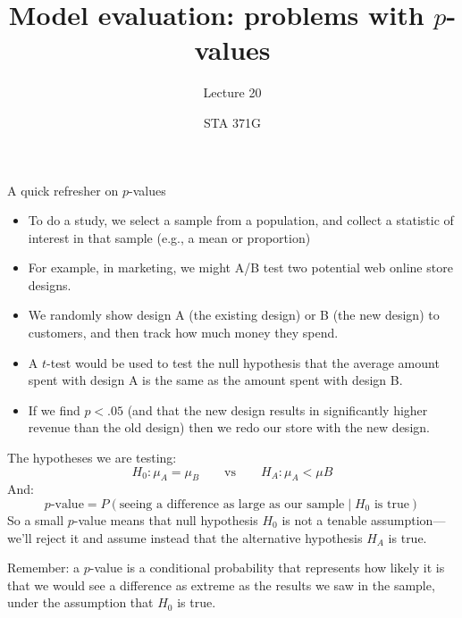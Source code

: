 \documentclass{beamer}\usepackage[]{graphicx}\usepackage[]{color}
\title{Model evaluation: problems with $p$-values}
\subtitle{Lecture 20}
\author{STA 371G}
\begin{document}
  

  

  \frame{\maketitle}



  \begin{darkframes}
    \begin{frame}{A quick refresher on $p$-values}
      \begin{itemize}[<+->]
        \item To do a study, we select a sample from a population, and collect a statistic of interest in that sample (e.g., a mean or proportion)
        \item For example, in marketing, we might A/B test two potential web online store designs.
        \item We randomly show design A (the existing design) or B (the new design) to customers, and then track how much money they spend.
        \item A $t$-test would be used to test the null hypothesis that the average amount spent with design A is the same as the amount spent with design B.
        \item If we find $p<.05$ (and that the new design results in significantly higher revenue than the old design) then we redo our store with the new design.
      \end{itemize}
    \end{frame}

    \begin{frame}
      The hypotheses we are testing:
      \[
        H_0 : \mu_A=\mu_B \qquad\text{vs}\qquad
        H_A : \mu_A<\mu B
      \]
      And:
      \[
        \text{$p$-value} = P(\text{seeing a difference as large as our sample} \mid \text{$H_0$ is true})
      \]
      \pause
      So a small $p$-value means that null hypothesis $H_0$ is not a tenable assumption---we'll reject it and assume instead that the alternative hypothesis $H_A$ is true.
    \end{frame}

    \begin{frame}
      Remember: a $p$-value is a \alert{conditional probability} that represents how likely it is that we would see a difference as extreme as the results we saw in the sample, under the assumption that $H_0$ is true.


\end{frame}
\end{darkframes}
\end{document}
